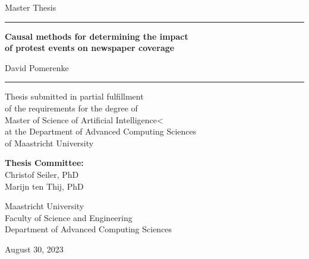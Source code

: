 \begin{centering}
\begin{large}

Master Thesis

\vspace{1cm}

\rule{5cm}{0.4pt}

\vspace{0.5cm}

\textbf{\Huge Causal methods for determining the impact\\
of protest events on newspaper coverage}

\vspace{0.5cm}

{\Large David Pomerenke}

\vspace{0.5cm}

\rule{5cm}{0.4pt}

\vspace{4cm}

Thesis submitted in partial fulfillment\\
of the requirements for the degree of\\
Master of Science of Artificial Intelligence<\\
at the Department of Advanced Computing Sciences\\
of Maastricht University

\vspace{1cm}

\textbf{Thesis Committee:}\\
Christof Seiler, PhD\\
Marijn ten Thij, PhD

\vspace{4cm}

Maastricht University\\
Faculty of Science and Engineering\\
Department of Advanced Computing Sciences

\vspace{2cm}

August 30, 2023

\end{large}
\end{centering}
\thispagestyle{empty}
\newpage
